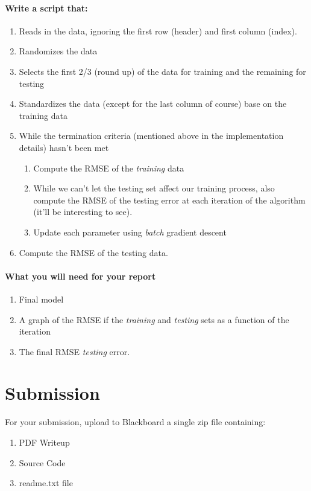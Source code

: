 \documentclass[12pt]{article}
\begin{document}
\paragraph{Write a script that:}
\begin{enumerate}
  \item Reads in the data, ignoring the first row (header) and first column (index).
  \item Randomizes the data
  \item Selects the first 2/3 (round up) of the data for training and the remaining for testing
  \item Standardizes the data (except for the last column of course) base on the training data
  \item While the termination criteria (mentioned above in the implementation details) hasn't been met
  \begin{enumerate}
  	\item Compute the RMSE of the \emph{training} data
  	\item While we can't let the testing set affect our training process, also compute the RMSE of the testing error at each iteration of the algorithm (it'll be interesting to see).
  	\item Update each parameter using \emph{batch} gradient descent
  \end{enumerate}
  \item Compute the RMSE of the testing data.
\end{enumerate}



\paragraph{What you will need for your report}
\begin{enumerate}
\item Final model
\item A graph of the RMSE if the \emph{training} and \emph{testing} sets as a function of the iteration
\item The final RMSE \emph{testing} error.
\end{enumerate}


\newpage
\section*{Submission}
For your submission, upload to Blackboard a single zip file containing:

\begin{enumerate}
\item PDF Writeup
\item Source Code
\item readme.txt file
\end{enumerate}
\end{document}
